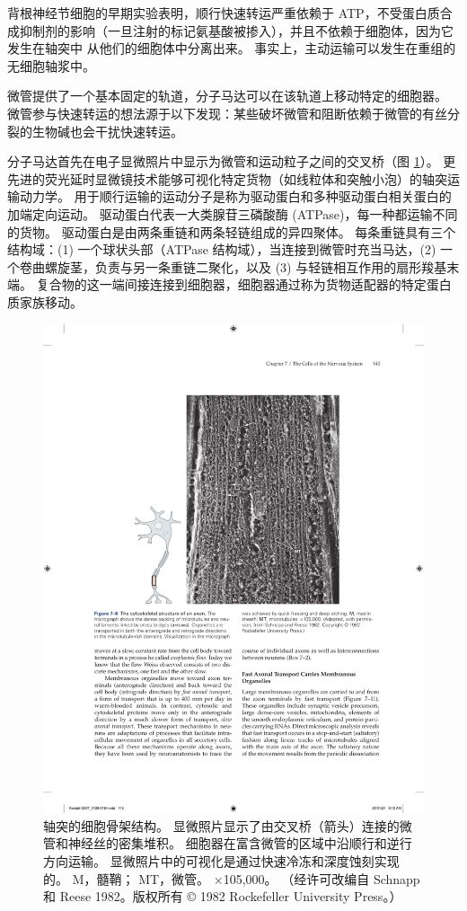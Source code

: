 背根神经节细胞的早期实验表明，顺行快速转运严重依赖于 ATP，不受蛋白质合成抑制剂的影响（一旦注射的标记氨基酸被掺入），并且不依赖于细胞体，因为它发生在轴突中 从他们的细胞体中分离出来。 
事实上，主动运输可以发生在重组的无细胞轴浆中。


微管提供了一个基本固定的轨道，分子马达可以在该轨道上移动特定的细胞器。 
微管参与快速转运的想法源于以下发现：某些破坏微管和阻断依赖于微管的有丝分裂的生物碱也会干扰快速转运。


分子马达首先在电子显微照片中显示为微管和运动粒子之间的交叉桥（图 \ref{fig:7_8}）。 
更先进的荧光延时显微镜技术能够可视化特定货物（如线粒体和突触小泡）的轴突运输动力学。 
用于顺行运输的运动分子是称为驱动蛋白和多种驱动蛋白相关蛋白的加端定向运动。 
驱动蛋白代表一大类腺苷三磷酸酶 (ATPase)，每一种都运输不同的货物。 
驱动蛋白是由两条重链和两条轻链组成的异四聚体。 
每条重链具有三个结构域：(1) 一个球状头部（ATPase 结构域），当连接到微管时充当马达，(2) 一个卷曲螺旋茎，负责与另一条重链二聚化，以及 (3) 与轻链相互作用的扇形羧基末端。 
复合物的这一端间接连接到细胞器，细胞器通过称为货物适配器的特定蛋白质家族移动。

\begin{figure}[htbp]
	\centering
	\includegraphics[width=1.0\linewidth]{chap07/fig_7_8}
	\caption{轴突的细胞骨架结构。 显微照片显示了由交叉桥（箭头）连接的微管和神经丝的密集堆积。 细胞器在富含微管的区域中沿顺行和逆行方向运输。 显微照片中的可视化是通过快速冷冻和深度蚀刻实现的。 M，髓鞘； MT，微管。 ×105,000。 （经许可改编自 Schnapp 和 Reese 1982。版权所有 © 1982 Rockefeller University Press。）}
	\label{fig:7_8}
\end{figure}


